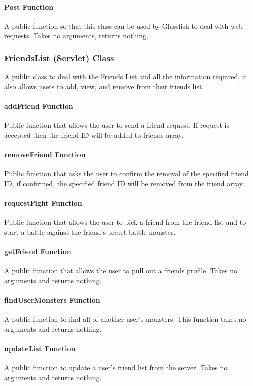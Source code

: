 \documentclass[titlepage]{article}
\begin{document}
\paragraph{Post Function}
A public function so that this class can be used by Glassfish to deal with web requests. Takes no arguments, returns nothing.

\subsubsection{FriendsList (Servlet) Class}
A public class to deal with the Friends List and all the information required, it also allows users to add, view, and remove from their friends list.

\paragraph{addFriend Function}
Public function that allows the user to send a friend request. If request is accepted then the friend ID will be added to friends array.

\paragraph{removeFriend Function}
Public function that asks the user to confirm the removal of the specified friend ID, if confirmed, the specified friend ID will be removed from the friend array.

\paragraph{requestFight Function}
Public function that allows the user to pick a friend from the friend list and to start a battle against the friend's preset battle monster.

\paragraph{getFriend Function}
A public function that allows the user to pull out a friends profile. Takes no arguments and returns nothing.

\paragraph{findUserMonsters Function}
A public function to find all of another user's monsters. This function takes no arguments and returns nothing.

\paragraph{updateList Function}
A public function to update a user's friend list from the server. Takes no arguments and returns nothing.
\end{document}

